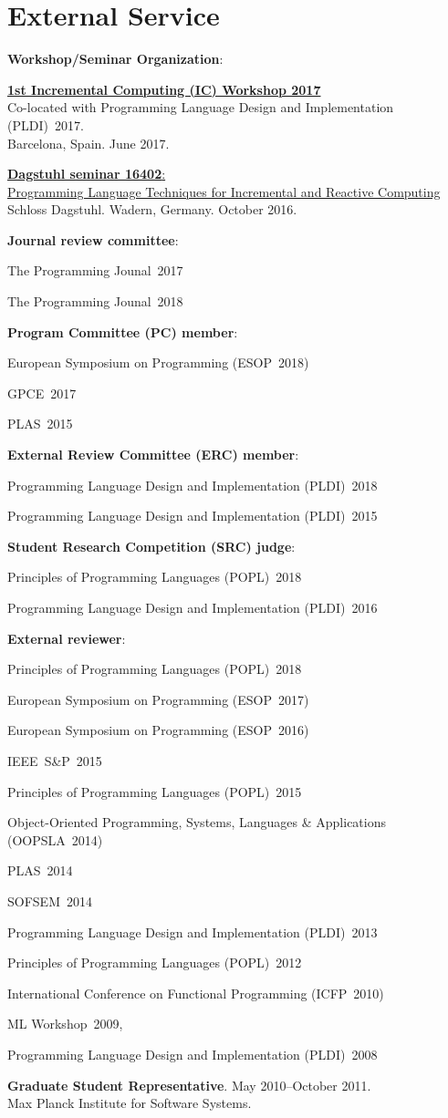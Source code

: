 \documentclass[10pt,letterpaper]{article}
\newcommand{\ReviewItem}[1]{\item #1}
\newcommand{\ReviewItemsBegin}{\begin{itemize}}
\newcommand{\ReviewItemsEnd}{\end{itemize}}
\newcommand{\POPL}[1]{Principles of Programming Languages (POPL)~#1}
\newcommand{\PLDI}[1]{Programming Language Design and Implementation (PLDI)~#1}
\newcommand{\OOPSLA}[1]{Object-Oriented Programming, Systems, Languages \& Applications (OOPSLA~#1)}
\newcommand{\ICFP}[1]{International Conference on Functional Programming (ICFP~#1)}
\newcommand{\ESOP}[1]{European Symposium on Programming (ESOP~#1)}
\newcommand{\Programming}[1]{The Programming Jounal~#1}
\newcommand{\PLAS}[1]{PLAS~#1}
\newcommand{\SOFSEM}[1]{SOFSEM~#1}
\newcommand{\MLWorkshop}[1]{ML Workshop~#1}
\newcommand{\IEEESP}[1]{IEEE~S\&P~#1}
\newcommand{\GPCE}[1]{GPCE~#1}
\renewenvironment{itemize}{
  \begin{list}{}{
    \setlength{\leftmargin}{1.5em}
    \setlength{\itemsep}{0.25em}
    \setlength{\parskip}{0pt}
    \setlength{\parsep}{0.25em}
  }
}{
  \end{list}
}
\begin{document}
\section*{External Service}
\begin{itemize}

\item \textbf{Workshop/Seminar Organization}:

\ReviewItemsBegin
\ReviewItem{
{\href{https://pldi17.sigplan.org/track/ic-2017-papers}
{\textbf{1st Incremental Computing (IC) Workshop 2017}}}
\\
Co-located with \PLDI{2017}.\\
Barcelona, Spain. June 2017.
}
\ReviewItem{
{\href{http://drops.dagstuhl.de/opus/volltexte/2017/6949/}
{\textbf{Dagstuhl seminar 16402}: 
\\
Programming Language Techniques for Incremental and Reactive Computing}}
\\
Schloss Dagstuhl. Wadern, Germany. October 2016.
}
\ReviewItemsEnd

\item \textbf{Journal review committee}:
\ReviewItemsBegin
\ReviewItem{\Programming{2017}}
\ReviewItem{\Programming{2018}}
\ReviewItemsEnd

\item \textbf{Program Committee (PC) member}:
\ReviewItemsBegin
\ReviewItem{\ESOP{2018}}
\ReviewItem{\GPCE{2017}}
\ReviewItem{\PLAS{2015}}
\ReviewItemsEnd

\item \textbf{External Review Committee (ERC) member}: 
\ReviewItemsBegin
\ReviewItem{\PLDI{2018}}
\ReviewItem{\PLDI{2015}}
\ReviewItemsEnd

\item \textbf{Student Research Competition (SRC) judge}:
\ReviewItemsBegin
\ReviewItem{\POPL{2018}}
\ReviewItem{\PLDI{2016}}
\ReviewItemsEnd

\item \textbf{External reviewer}:
\ReviewItemsBegin
\ReviewItem{\POPL{2018}}
\ReviewItem{\ESOP{2017}}
\ReviewItem{\ESOP{2016}} 
\ReviewItem{\IEEESP{2015}}
\ReviewItem{\POPL{2015}} %
\ReviewItem{\OOPSLA{2014}} %
\ReviewItem{\PLAS{2014}} %
\ReviewItem{\SOFSEM{2014}} %
\ReviewItem{\PLDI{2013}} %
\ReviewItem{\POPL{2012}} 
\ReviewItem{\ICFP{2010}} 
\ReviewItem{\MLWorkshop{2009}},
\ReviewItem{\PLDI{2008}}
\ReviewItemsEnd

\item \textbf{Graduate Student Representative}.  
  May 2010--October 2011.
  \\
  Max Planck Institute for Software Systems.
 
\end{itemize}
\end{document}
